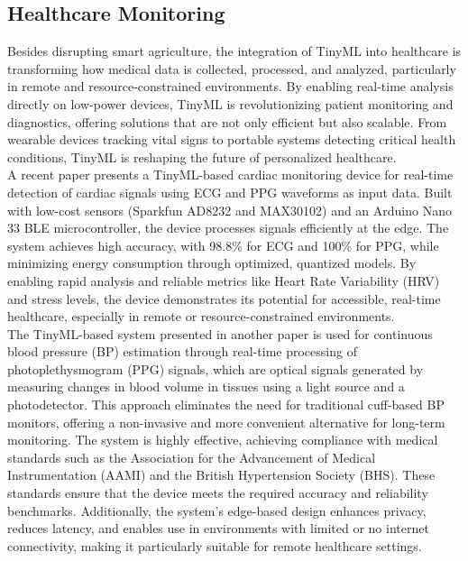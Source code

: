 \documentclass[twocolumn]{article}
\begin{document}
\subsection{Healthcare Monitoring}

Besides disrupting smart agriculture, the integration of TinyML into healthcare is transforming how medical data is collected, processed, and analyzed, particularly in remote and resource-constrained environments. By enabling real-time analysis directly on low-power devices, TinyML is revolutionizing patient monitoring and diagnostics, offering solutions that are not only efficient but also scalable. From wearable devices tracking vital signs to portable systems detecting critical health conditions, TinyML is reshaping the future of personalized healthcare. \\[0.1cm]

A recent paper presents a TinyML-based cardiac monitoring device for real-time detection of cardiac signals using ECG and PPG waveforms as input data. Built with low-cost sensors (Sparkfun AD8232 and MAX30102) and an Arduino Nano 33 BLE microcontroller, the device processes signals efficiently at the edge. The system achieves high accuracy, with 98.8\% for ECG and 100\% for PPG, while minimizing energy consumption through optimized, quantized models. By enabling rapid analysis and reliable metrics like Heart Rate Variability (HRV) and stress levels, the device demonstrates its potential for accessible, real-time healthcare, especially in remote or resource-constrained environments.\cite{r_tiny_2024}\\[0.1cm]


The TinyML-based system presented in another paper is used for continuous blood pressure (BP) estimation through real-time processing of photoplethysmogram (PPG) signals, which are optical signals generated by measuring changes in blood volume in tissues using a light source and a photodetector. This approach eliminates the need for traditional cuff-based BP monitors, offering a non-invasive and more convenient alternative for long-term monitoring. The system is highly effective, achieving compliance with medical standards such as the Association for the Advancement of Medical Instrumentation (AAMI) and the British Hypertension Society (BHS). These standards ensure that the device meets the required accuracy and reliability benchmarks. Additionally, the system’s edge-based design enhances privacy, reduces latency, and enables use in environments with limited or no internet connectivity, making it particularly suitable for remote healthcare settings. \cite{sun_case_2023}\\[0.1cm]
\end{document}
